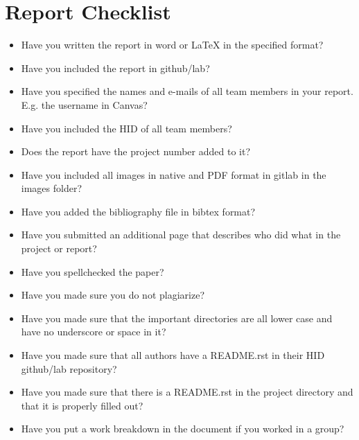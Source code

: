 \documentclass[9pt,twocolumn,twoside]{styles/osajnl}
\begin{document}
\section{Report Checklist}

\begin{itemize}
\renewcommand{\labelitemi}{\scriptsize$\square$} 
\item Have you written the report in word or LaTeX in the specified
  format?
\item Have you included the report in github/lab?
\item Have you specified the names and e-mails of all team members in
  your report. E.g. the username in Canvas?
\item Have you included the HID of all team members?
\item Does the report have the project number added to it?
\item Have you included all images in native and PDF format in gitlab
  in the images folder?
\item Have you added the bibliography file in bibtex format?
\item Have you submitted an additional page that describes who did
  what in the project or report?
\item Have you spellchecked the paper?
\item Have you made sure you do not plagiarize?
\item Have you made sure that the important directories are all lower
  case and have no underscore or space in it?
\item Have you made sure that all authors have a README.rst in their
  HID github/lab repository?
\item Have you made sure that there is a README.rst in the project
  directory and that it is properly filled out?
\item Have you put a work breakdown in the document if you worked in a
  group?
\end{itemize}
\end{document}
